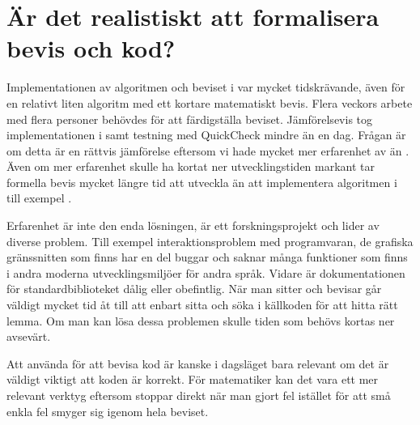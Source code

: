 \section{Är det realistiskt att formalisera bevis och kod?}
Implementationen av algoritmen och beviset i \coq{} var mycket tidskrävande,
även för en relativt liten algoritm med ett kortare matematiskt bevis. Flera
veckors arbete med flera personer behövdes för att färdigställa beviset.
Jämförelsevis tog implementationen i \haskell{} samt testning med QuickCheck
mindre än en dag. Frågan är om detta är en rättvis jämförelse eftersom vi hade
mycket mer erfarenhet av \haskell{} än \coq{}. Även om mer erfarenhet skulle ha
kortat ner utvecklingstiden markant tar formella bevis mycket
längre tid att utveckla än att implementera algoritmen i till exempel \haskell{}.

Erfarenhet är inte den enda lösningen, \coq{} är ett forskningsprojekt och
lider av diverse problem. Till exempel interaktionsproblem med programvaran, de
grafiska gränssnitten som finns har en del buggar och saknar många funktioner
som finns i andra moderna utvecklingsmiljöer för andra språk. Vidare är
dokumentationen för standardbiblioteket dålig eller obefintlig. När man sitter
och bevisar går väldigt mycket tid åt till att enbart sitta och söka i
källkoden för att hitta rätt lemma. Om man kan lösa dessa problemen skulle
tiden som behövs kortas ner avsevärt.

Att använda \coq{} för att bevisa kod är kanske i dagsläget bara relevant om
det är väldigt viktigt att koden är korrekt. För matematiker kan det vara ett
mer relevant verktyg eftersom \coq{} stoppar direkt när man gjort fel istället
för att små enkla fel smyger sig igenom hela beviset.
